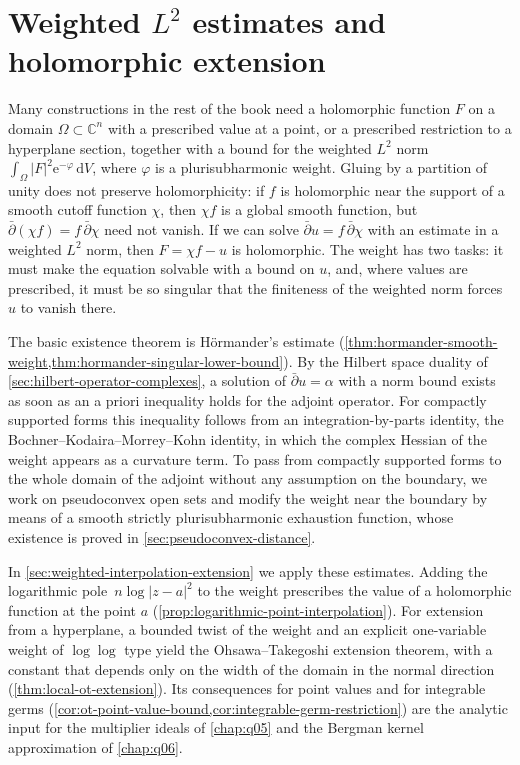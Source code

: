 \chapter{Weighted \texorpdfstring{$L^2$}{L2} estimates and holomorphic extension}
\label{chap:q04}

Many constructions in the rest of the book need a holomorphic function $F$ on a domain $\Omega\subset\mathbb C^n$ with a prescribed value at a point, or a prescribed restriction to a hyperplane section, together with a bound for the weighted $L^2$ norm $\int_\Omega|F|^2\mathrm e^{-\varphi}\,\mathrm dV$, where $\varphi$ is a plurisubharmonic weight. Gluing by a partition of unity does not preserve holomorphicity: if $f$ is holomorphic near the support of a smooth cutoff function $\chi$, then $\chi f$ is a global smooth function, but $\bar\partial(\chi f)=f\,\bar\partial\chi$ need not vanish. If we can solve $\bar\partial u=f\,\bar\partial\chi$ with an estimate in a weighted $L^2$ norm, then $F=\chi f-u$ is holomorphic. The weight has two tasks: it must make the equation solvable with a bound on $u$, and, where values are prescribed, it must be so singular that the finiteness of the weighted norm forces $u$ to vanish there.

The basic existence theorem is H\"ormander's estimate (\cref{thm:hormander-smooth-weight,thm:hormander-singular-lower-bound}). By the Hilbert space duality of \cref{sec:hilbert-operator-complexes}, a solution of $\bar\partial u=\alpha$ with a norm bound exists as soon as an a priori inequality holds for the adjoint operator. For compactly supported forms this inequality follows from an integration-by-parts identity, the Bochner--Kodaira--Morrey--Kohn identity, in which the complex Hessian of the weight appears as a curvature term. To pass from compactly supported forms to the whole domain of the adjoint without any assumption on the boundary, we work on pseudoconvex open sets and modify the weight near the boundary by means of a smooth strictly plurisubharmonic exhaustion function, whose existence is proved in \cref{sec:pseudoconvex-distance}.

In \cref{sec:weighted-interpolation-extension} we apply these estimates. Adding the logarithmic pole~${n\log|z-a|^2}$ to the weight prescribes the value of a holomorphic function at the point $a$ (\cref{prop:logarithmic-point-interpolation}). For extension from a hyperplane, a bounded twist of the weight and an explicit one-variable weight of $\log\log$ type yield the Ohsawa--Takegoshi extension theorem, with a constant that depends only on the width of the domain in the normal direction (\cref{thm:local-ot-extension}). Its consequences for point values and for integrable germs (\cref{cor:ot-point-value-bound,cor:integrable-germ-restriction}) are the analytic input for the multiplier ideals of \cref{chap:q05} and the Bergman kernel approximation of \cref{chap:q06}.

